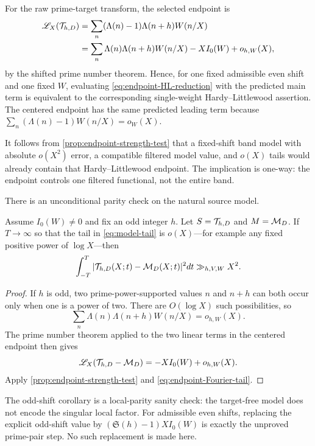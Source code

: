 For the raw prime-target transform, the selected endpoint is
\begin{equation}
 \begin{aligned}
 \mathscr L_X(\mathcal T_{h,D})
 &=\sum_n(\Lambda(n)-1)\Lambda(n+h)W(n/X)\\
 &=\sum_n\Lambda(n)\Lambda(n+h)W(n/X)
 -X I_0(W)+o_{h,W}(X),
 \end{aligned}
 \label{eq:endpoint-HL-reduction}
\end{equation}
by the shifted prime number theorem.  Hence, for one fixed admissible even
shift and one fixed $W$, evaluating \eqref{eq:endpoint-HL-reduction} with
the predicted main term is equivalent to the corresponding single-weight
Hardy--Littlewood assertion.  The centered endpoint has the same predicted
leading term because
$\sum_n(\Lambda(n)-1)W(n/X)=o_W(X)$.

It follows from \cref{prop:endpoint-strength-test} that a fixed-shift band
model with absolute $o(X^2)$ error, a compatible filtered model value, and
$o(X)$ tails would already contain that Hardy--Littlewood endpoint.  The
implication is one-way: the endpoint controls one filtered functional, not
the entire band.

There is an unconditional parity check on the natural source model.

\begin{corollary}
\label{cor:odd-shift-model-floor}
Assume $I_0(W)\ne0$ and fix an odd integer $h$.  Let
$S=\mathcal T_{h,D}$ and $M=\mathcal M_D$.  If $T\to\infty$ so that the tail in
\eqref{eq:model-tail} is $o(X)$---for example any fixed positive power of
$\log X$---then
\begin{equation}
 \int_{-T}^{T}|\mathcal T_{h,D}(X;t)-\mathcal M_D(X;t)|^2dt
 \gg_{h,V,W}X^2.
 \label{eq:odd-shift-band-floor}
\end{equation}
\end{corollary}

\begin{proof}
If $h$ is odd, two prime-power-supported values $n$ and $n+h$ can both
occur only when one is a power of two.  There are $O(\log X)$ such
possibilities, so
\[
 \sum_n\Lambda(n)\Lambda(n+h)W(n/X)=o_{h,W}(X).
\]
The prime number theorem applied to the two linear terms in the centered
endpoint then gives
\[
 \mathscr L_X(\mathcal T_{h,D}-\mathcal M_D)
 =-X I_0(W)+o_{h,W}(X).
\]
Apply \cref{prop:endpoint-strength-test} and
\eqref{eq:endpoint-Fourier-tail}.
\end{proof}

\begin{remark}
The odd-shift corollary is a local-parity sanity check: the target-free
model does not encode the singular local factor.  For admissible even
shifts, replacing the explicit odd-shift value by
$(\mathfrak S(h)-1)XI_0(W)$ is exactly the unproved prime-pair step.  No
such replacement is made here.
\end{remark}
